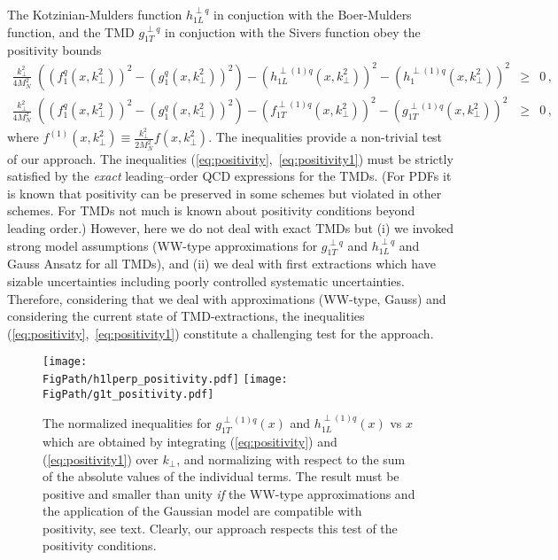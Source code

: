 \documentclass[a4paper,11pt]{article}
\newcommand{\ba}{\begin{eqnarray}}
\newcommand{\ea}{\end{eqnarray}}
\def\kperp{k_\perp}
\newcommand*{\FigPath}{./figs}%
\begin{document}
The Kotzinian-Mulders function $h^{\perp q}_{1L}$ in conjuction with 
the Boer-Mulders function, and the TMD $g^{\perp q}_{1T}$ in conjuction 
with the Sivers function obey the positivity bounds 
\cite{Bacchetta:1999kz}
\begin{subequations}\ba
	\frac{\kperp^2}{4M_N^2}\;
	\left((f_{1}^{q}(x,\kperp^2))^2 -(g_{1}^{q}(x,\kperp^2))^2\right)
	- (h^{\perp(1)q}_{1L}(x,\kperp^2))^2 
	- (h_{1}^{\perp(1)q}(x,\kperp^2))^2
	& \ge & 0\,, \quad \label{eq:positivity}\\
	\frac{\kperp^2}{4M_N^2}\;
	\left((f_{1}^{q}(x,\kperp^2))^2 -(g_{1}^{q}(x,\kperp^2))^2\right)
	- (f_{1T}^{\perp(1)q}(x,\kperp^2))^2
	- (g^{\perp(1)q}_{1T}(x,\kperp^2))^2 
	& \ge & 0\,, \quad \label{eq:positivity1}
\ea\end{subequations}
where $f^{(1)}(x,\kperp^2) \equiv \frac{\kperp^2}{2M_N^2} f(x,\kperp^2)$.
The inequalities provide a non-trivial test of our approach.
The inequalities (\ref{eq:positivity},~\ref{eq:positivity1}) 
must be strictly satisfied by the {\it exact} leading--order QCD 
expressions for the TMDs.  
(For PDFs it is known that positivity can be preserved in some 
schemes but violated in other schemes. For TMDs not much is 
known about positivity conditions beyond leading order.)
However, here we do not deal with exact TMDs but (i) we invoked 
strong model assumptions (WW-type approximations for $g^{\perp q}_{1T}$ 
and $h^{\perp q}_{1L}$ and Gauss Ansatz for all TMDs), and (ii) we deal 
with first extractions which have sizable uncertainties including 
poorly controlled systematic uncertainties.
Therefore, considering that we deal with approximations 
(WW-type, Gauss) and considering the current state of TMD-extractions, 
the inequalities (\ref{eq:positivity},~\ref{eq:positivity1}) constitute
a challenging test for the approach.

\begin{figure}[b!]
\centering
\texttt{[image: \\FigPath/h1lperp\_positivity.pdf]} \quad  
\texttt{[image: \\FigPath/g1t\_positivity.pdf]}  
	\caption{\label{h1l_pos} 
	The normalized inequalities for $g^{\perp(1)q}_{1T}(x)$ and
	$h^{\perp(1)q}_{1L}(x)$ vs $x$ which are obtained by integrating
	(\ref{eq:positivity}) and (\ref{eq:positivity1}) over $\kperp$,
	and normalizing with respect to the sum of the absolute
	values of the individual terms. The result must be positive and 
	smaller than unity {\it if} the WW-type approximations
	and the application of the Gaussian model are compatible
	with positivity, see text. Clearly, our approach respects 
	this test of the positivity conditions.}
\end{figure}
\end{document}
